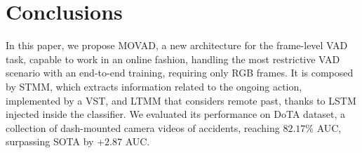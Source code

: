 \section{Conclusions}
\label{sec:conclusions}

In this paper, we propose MOVAD, a new architecture for the frame-level VAD task, capable to work in an online fashion, handling the most restrictive VAD scenario with an end-to-end training, requiring only RGB frames.
It is composed by STMM, which extracts information related to the ongoing action, implemented by a VST, and LTMM that considers remote past, thanks to LSTM injected inside the classifier.
We evaluated its performance on DoTA dataset, a collection of dash-mounted camera videos of accidents, reaching $82.17\%$ AUC, surpassing SOTA by +$2.87$ AUC.